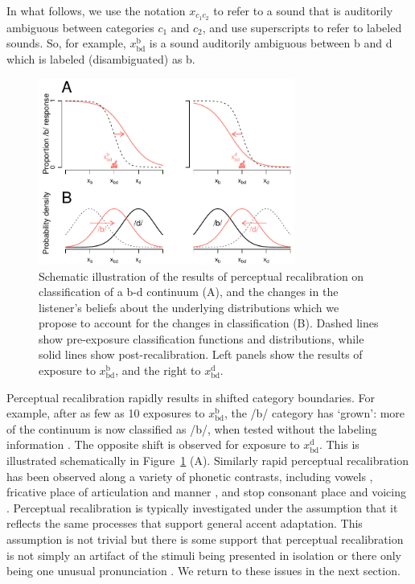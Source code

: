 In what follows, we use the notation $x_{c_1 c_2}$ to refer to a sound that is auditorily ambiguous between categories $c_1$ and $c_2$, and use superscripts to refer to labeled sounds.  So, for example, $x_\mathrm{bd}^\mathrm{b}$ is a sound auditorily ambiguous between \ph b and \ph d which is labeled (disambiguated) as \ph b.

\begin{figure}[htb]
  \centering
  \includegraphics[width=0.75\textwidth]{figs/belief-updating-recal-schematic.pdf}
  \caption{Schematic illustration of the results of perceptual recalibration on classification of a \ph b-\ph d continuum (A), and the changes in the listener's beliefs about the underlying distributions which we propose to account for the changes in classification (B).  Dashed lines show pre-exposure classification functions and distributions, while solid lines show post-recalibration.  Left panels show the results of exposure to $x_\mathrm{bd}^\mathrm{b}$, and the right to $x_\mathrm{bd}^\mathrm{d}$.}
  \label{fig:belief-updating-schematic}
\end{figure}

Perceptual recalibration rapidly results in shifted category boundaries. For example, after as few as 10 exposures to $x_\mathrm{bd}^\mathrm{b}$, the /b/ category has `grown': more of the continuum is now classified as /b/, when tested without the labeling information \autocite{Vroomen2007}. The opposite shift is observed for exposure to $x_\mathrm{bd}^\mathrm{d}$. This is illustrated schematically in Figure~\ref{fig:belief-updating-schematic} (A). Similarly rapid perceptual recalibration has been observed along a variety of phonetic contrasts, including vowels \autocite{Maye2008a}, fricative place of articulation and manner \autocite{Kraljic2005,Norris2003}, and stop consonant place \autocite{Bertelson2003} and voicing \autocite{Kraljic2006}.  Perceptual recalibration is typically investigated under the assumption that it reflects the same processes that support general accent adaptation.  This assumption is not trivial but there is some support that perceptual recalibration is not simply an artifact of the stimuli being presented in isolation \autocite{Eisner2006} or there only being one unusual pronunciation \autocite{Reinisch2014}.  We return to these issues in the next section. %

